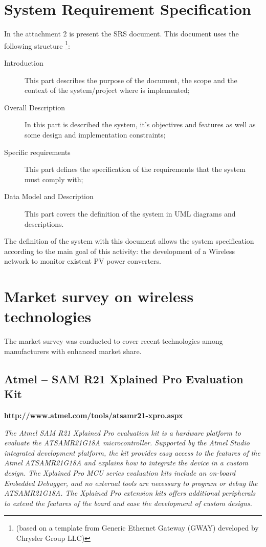 \section{System Requirement Specification}
In the attachment 2 is present the SRS document. This document uses the following structure \footnote{(based on a template from Generic Ethernet Gateway (GWAY) developed by Chrysler Group LLC)}:
\begin{description}
	\item[Introduction] This part describes the purpose of the document, the scope and the context of the system/project where is implemented;
	
	\item[Overall Description] In this part is described the system, it's objectives and features as well as some design and implementation constraints;
	
	\item[Specific requirements] This part defines the specification of the requirements that the system must comply with;
	
	\item[Data Model and Description] This part covers the definition of the system in UML diagrams and descriptions.
			
\end{description}

The definition of the system with this document allows the system specification according to the main goal of this activity: the development of a Wireless network to monitor existent PV power converters.
\vspace{2em}
\section{Market	survey on wireless technologies}
The market survey was conducted to cover recent technologies among manufacturers with enhanced market share.




\subsection{Atmel -- SAM R21 Xplained Pro Evaluation Kit}

\begin{mdframed}[	linecolor=black, outerlinewidth=5pt]
	\textbf{http://www.atmel.com/tools/atsamr21-xpro.aspx} 
	
	\small
	\textit{The Atmel SAM R21 Xplained Pro evaluation kit is a hardware platform to evaluate the ATSAMR21G18A microcontroller. Supported by the Atmel Studio integrated development platform, the kit provides easy access to the features of the Atmel ATSAMR21G18A and explains how to integrate the device in a custom design. The Xplained Pro MCU series evaluation kits include an on-board Embedded Debugger, and no external tools are necessary to program or debug the ATSAMR21G18A. The Xplained Pro extension kits offers additional peripherals to extend the features of the board and ease the development of custom designs.}	
\end{mdframed}



